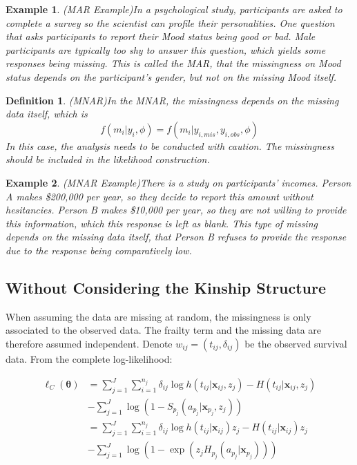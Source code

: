 \documentclass[preprint,12pt]{elsarticle}
\newtheorem{defn}{Definition}
\newtheorem{eg}{Example}
\begin{document}
\begin{eg}(MAR Example)\label{eg:MARExample}
    In a psychological study, participants are asked to complete a survey so the scientist can profile their personalities. 
    One question that asks participants to report their Mood status being good or bad. 
    Male participants are typically too shy to answer this question, which yields some responses being missing. 
    This is called the MAR, that the missingness on Mood status depends on the participant's gender, but not on the missing Mood itself.
\end{eg}
\begin{defn}(MNAR)\label{defn:MNAR}
    In the MNAR, the missingness depends on the missing data itself, which is 
    \begin{equation} 
        f(m_i|y_i,\phi)=f(m_i|y_{i,mis}, y_{i,obs}, \phi)
    \end{equation}
    In this case, the analysis needs to be conducted with caution. 
    The missingness should be included in the likelihood construction.
\end{defn}
\begin{eg}(MNAR Example)\label{eg:MNARExample}
    There is a study on participants' incomes. 
    Person A makes \$200,000 per year, so they decide to report this amount without hesitancies. 
    Person B makes \$10,000 per year, so they are not willing to provide this information, which this response is left as blank. 
    This type of missing depends on the missing data itself, that Person B refuses to provide the response due to the response being comparatively low. 
\end{eg}
\subsection{Without Considering the Kinship Structure}\label{sec:without}
When assuming the data are missing at random, the missingness is only associated to the observed data. 
The frailty term and the missing data are therefore assumed independent. 
Denote $w_{ij} = (t_{ij}, \delta_{ij})$ be the observed survival data.
From the complete log-likelihood:

\begin{align} 
    \ell_C(\boldsymbol{\theta})&=\sum_{j=1}^J\sum_{i=1}^{n_j}\delta_{ij}\log h(t_{ij}|\mathbf{x}_{ij}, z_j) - H(t_{ij}|\mathbf{x}_{ij}, z_j)\\
    &-\sum_{j=1}^J \log (1-S_{p_j}(a_{p_j}|\mathbf{x}_{p_j}, z_j)) \\
    &= \sum_{j=1}^J\sum_{i=1}^{n_j}\delta_{ij}\log h(t_{ij}|\mathbf{x}_{ij})z_j - H(t_{ij}|\mathbf{x}_{ij})z_j \\
    &- \sum_{j=1}^{J} \log(1- \exp(z_j H_{p_j}(a_{p_j}|\mathbf{x}_{p_j})))
\end{align}
\end{document}
